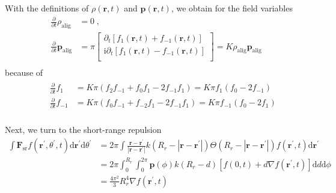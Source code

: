 \documentclass[10pt,aspectratio=43,mathserif,table]{beamer}
\begin{document}
\begin{frame}
    With the definitions of $\rho \left( \mathbf{r},t \right)$ and $\boldsymbol{p}\left( \mathbf{r},t \right)$, we obtain for the field variables
    \begin{equation}
        \begin{aligned}
            \frac{\partial}{\partial t}\rho _{\mathrm{alig}}&=0\;,\\
            \frac{\partial}{\partial t}\boldsymbol{p}_{\mathrm{alig}}&=\pi \left[ \begin{array}{c}
            \partial _t\left[ f_1\left( \mathbf{r},t \right) +f_{-1}\left( \mathbf{r},t \right) \right]\\
            \mathrm{i}\partial _t\left[ f_1\left( \mathbf{r},t \right) -f_{-1}\left( \mathbf{r},t \right) \right]\\
        \end{array} \right] =K\rho _{\mathrm{alig}}\boldsymbol{p}_{\mathrm{alig}}\\
        \end{aligned}
    \end{equation}
    because of
    \begin{eqnarray}
        \begin{aligned}
            &&\frac{\partial}{\partial t}f_1&=K\pi \left( f_2f_{-1}+f_0f_1-2f_{-1}f_1 \right) =K\pi f_1\left( f_0-2f_{-1} \right)\\
            &&\frac{\partial}{\partial t}f_{-1}&=K\pi \left( f_0f_{-1}+f_{-2}f_1-2f_{-1}f_1 \right) =K\pi f_{-1}\left( f_0-2f_1 \right)\\
        \end{aligned}
    \end{eqnarray}

\end{frame}

\begin{frame}
    \small
    Next, we turn to the short-range repulsion
    \begin{equation}
        \begin{aligned}
            \int{\boldsymbol{F}_{\mathrm{sr}}f\left( \mathbf{r}^{\prime},\theta ^{\prime},t \right) \mathrm{d}\mathbf{r}^{\prime}\mathrm{d}\theta ^{\prime}}&=2\pi \int{\frac{\mathbf{r}-\mathbf{r}^{\prime}}{\left| \mathbf{r}-\mathbf{r}^{\prime} \right|}k\left( R_r-\left| \mathbf{r}-\mathbf{r}^{\prime} \right| \right) \Theta \left( R_r-\left| \mathbf{r}-\mathbf{r}^{\prime} \right| \right) f\left( \mathbf{r}^{\prime},t \right) \mathrm{d}\mathbf{r}^{\prime}}\\
            &=2\pi \int_0^{R_r}{\int_0^{2\pi}{\mathbf{p}\left( \phi \right) k\left( R_r-d \right) \left[ f\left( 0,t \right) +d\nabla f\left( \mathbf{r}^{\prime},t \right) \right] \mathrm{d}d\mathrm{d}\phi}}\\
            &=\frac{4\pi ^2}{3}R_{r}^{4}\nabla f\left( \mathbf{r}^{\prime},t \right)\\
        \end{aligned}
    \end{equation}
\end{frame}
\end{document}
